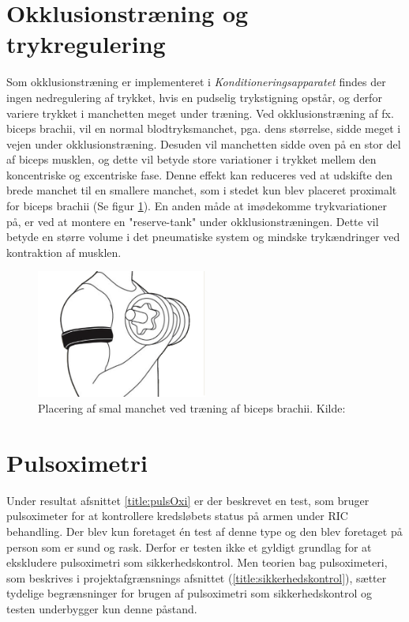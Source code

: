 \section{Okklusionstræning og trykregulering}
Som okklusionstræning er implementeret i \textit{Konditioneringsapparatet} findes der ingen nedregulering af trykket, hvis en pudselig trykstigning opstår, og derfor variere trykket i manchetten meget under træning. Ved okklusionstræning af fx. biceps brachii, vil en normal blodtryksmanchet, pga. dens størrelse, sidde meget i vejen under okklusionstræning. Desuden vil manchetten sidde oven på en stor del af biceps musklen, og dette vil betyde store variationer i trykket mellem den koncentriske og excentriske fase. Denne effekt kan reduceres ved at udskifte den brede manchet til en smallere manchet, som i stedet kun blev placeret proximalt for biceps brachii (Se figur \ref{fig:okklcuff}). En anden måde at imødekomme trykvariationer på, er ved at montere en "reserve-tank" under okklusionstræningen. Dette vil betyde en større volume i det pneumatiske system og mindske trykændringer ved kontraktion af musklen. 
\begin{figure}[H]
	\centering
	\includegraphics[trim={1.5cm 0 1.5cm 0}, clip, width=0.5\textwidth]{billeder/okklusionCuff.png}
	\caption{Placering af smal manchet ved træning af biceps brachii. Kilde: \cite{Billede:3}}\label{fig:okklcuff}
\end{figure}

\section{Pulsoximetri}
Under resultat afsnittet \ref{title:pulsOxi} er der beskrevet en test, som bruger pulsoximeter for at kontrollere kredsløbets status på armen under RIC behandling. Der blev kun foretaget én test af denne type og den blev foretaget på person som er sund og rask. Derfor er testen ikke et gyldigt grundlag for at ekskludere pulsoximetri som sikkerhedskontrol. Men teorien bag pulsoximeteri, som beskrives i projektafgrænsnings afsnittet (\ref{title:sikkerhedskontrol}), sætter tydelige begrænsninger for brugen af pulsoximetri som sikkerhedskontrol og testen underbygger kun denne påstand. 

